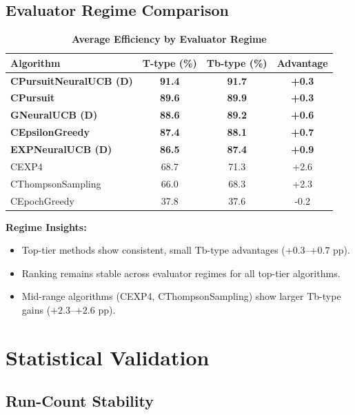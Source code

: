 \documentclass[12pt,a4paper]{article}
\newcommand{\performance}[1]{\textcolor{performancecolor}{\textbf{#1}}}
\newcommand{\legacy}[1]{\textcolor{legacycolor}{\textbf{#1}}}
\newcommand{\neural}[1]{\textcolor{neuralcolor}{\textbf{#1}}}
\begin{document}
\subsection{Evaluator Regime Comparison}

\begin{table}[H]
\centering
\caption{\performance{Average Efficiency by Evaluator Regime}}
\begin{tabular}{|l|c|c|c|}
\hline
\textbf{Algorithm} & \textbf{T-type (\%)} & \textbf{Tb-type (\%)} & \textbf{Advantage} \\
\hline
\hline
\neural{CPursuitNeuralUCB (D)}   & \neural{91.4}     & \neural{91.7}     & \neural{+0.3} \\
\performance{CPursuit}           & \performance{89.6} & \performance{89.9} & \performance{+0.3} \\
\neural{GNeuralUCB (D)}          & \neural{88.6}     & \neural{89.2}     & \neural{+0.6} \\
\performance{CEpsilonGreedy}     & \performance{87.4} & \performance{88.1} & \performance{+0.7} \\
\legacy{EXPNeuralUCB (D)}        & \legacy{86.5}     & \legacy{87.4}     & \legacy{+0.9} \\
CEXP4                           & 68.7              & 71.3              & +2.6 \\
CThompsonSampling               & 66.0              & 68.3              & +2.3 \\
CEpochGreedy                    & 37.8              & 37.6              & -0.2 \\
\hline
\end{tabular}
\end{table}

\textbf{Regime Insights:}
\begin{itemize}
\item Top-tier methods show consistent, small Tb-type advantages ($+0.3$--$+0.7$ pp).
\item Ranking remains stable across evaluator regimes for all top-tier algorithms.
\item Mid-range algorithms (CEXP4, CThompsonSampling) show larger Tb-type gains ($+2.3$--$+2.6$ pp).
\end{itemize}

\newpage
\section{Statistical Validation}

\subsection{Run-Count Stability}
\end{document}
